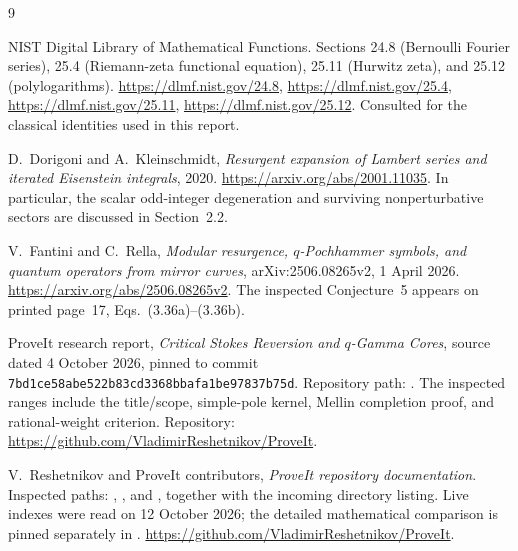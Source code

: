 \documentclass[11pt,a4paper]{article}
\numberwithin{equation}{section}
\theoremstyle{definition}\newtheorem{definition}[theorem]{Definition}
\theoremstyle{remark}\newtheorem{remark}[theorem]{Remark}
\newcommand{\pin}{\texttt{7bd1ce58abe522b83cd3368bbafa1be97837b75d}}
\begin{document}
\begin{thebibliography}{9}

NIST Digital Library of Mathematical Functions.
Sections 24.8 (Bernoulli Fourier series), 25.4 (Riemann-zeta functional
equation), 25.11 (Hurwitz zeta), and 25.12 (polylogarithms).
\url{https://dlmf.nist.gov/24.8},
\url{https://dlmf.nist.gov/25.4},
\url{https://dlmf.nist.gov/25.11},
\url{https://dlmf.nist.gov/25.12}.
Consulted for the classical identities used in this report.

D.~Dorigoni and A.~Kleinschmidt,
\emph{Resurgent expansion of Lambert series and iterated Eisenstein
integrals}, 2020.
\url{https://arxiv.org/abs/2001.11035}.
In particular, the scalar odd-integer degeneration and surviving
nonperturbative sectors are discussed in Section~2.2.

V.~Fantini and C.~Rella,
\emph{Modular resurgence, $q$-Pochhammer symbols, and quantum operators
from mirror curves}, arXiv:2506.08265v2, 1 April 2026.
\url{https://arxiv.org/abs/2506.08265v2}.
The inspected Conjecture~5 appears on printed page~17,
Eqs.~(3.36a)--(3.36b).

ProveIt research report,
\emph{Critical Stokes Reversion and $q$-Gamma Cores}, source dated
4 October 2026, pinned to commit \pin.
Repository path:
%
%
.
The inspected ranges include the title/scope, simple-pole kernel,
Mellin completion proof, and rational-weight criterion.
Repository: \url{https://github.com/VladimirReshetnikov/ProveIt}.

V.~Reshetnikov and ProveIt contributors,
\emph{ProveIt repository documentation}.
Inspected paths:
,
,
and , together with the incoming directory
listing. Live indexes were read on 12 October 2026; the detailed
mathematical comparison is pinned separately in \cite{repoq}.
\url{https://github.com/VladimirReshetnikov/ProveIt}.

\end{thebibliography}
\end{document}
